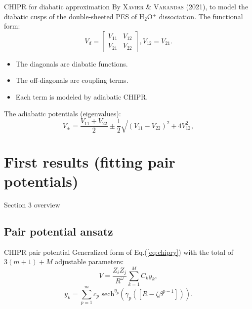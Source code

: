 \documentclass{beamer}
\def\D{\displaystyle}
\begin{document}
\begin{frame}{CHIPR for diabatic approximation}
    By \textsc{Xavier \& Varandas} (2021), to model the diabatic cusps of the double-sheeted PES of H$_2$O$^+$ dissociation. The functional form:
    \begin{equation}
        V_d = 
        \begin{bmatrix}
            V_{11} & V_{12} \\
            V_{21} & V_{22}
        \end{bmatrix}
        , V_{12} = V_{21}.
    \label{2x2diabaticmatrix}
    \end{equation}
    \begin{itemize}
        \item The diagonals are diabatic functions.
        \item The off-diagonals are coupling terms.
        \item Each term is modeled by adiabatic CHIPR.
    \end{itemize}
    The adiabatic potentials (eigenvalues):
    \begin{equation}
        V_{\pm} = \frac{V_{11} + V_{22}}{2} \pm \frac{1}{2}\sqrt{(V_{11} - V_{22})^2 + 4V_{12}^2},
        \label{2x2ev}
    \end{equation}
\end{frame}

\section{First results (fitting pair potentials)}
\begin{frame}{Section 3 overview}
    \tableofcontents[sections={3}]
\end{frame}
\subsection{Pair potential ansatz}
\begin{frame}{CHIPR pair potential}
    Generalized form of Eq.(\ref{eq:chipry}) with the total of $3(m + 1) + M$ adjustable parameters:
    \begin{equation}
        V = \frac{Z_iZ_j}{R^{\omega}}\sum_{k=1}^M C_ky_k,
        \label{eq:chiprv2general}
    \end{equation}
    \begin{equation}
        y_k = \D\sum_{p=1}^m c_{p}\text{ sech}^{\eta_{p}}(\gamma_{p}(\left[R - \zeta\beta^{p-1}\right])).
    \end{equation}
\end{frame}
\end{document}
